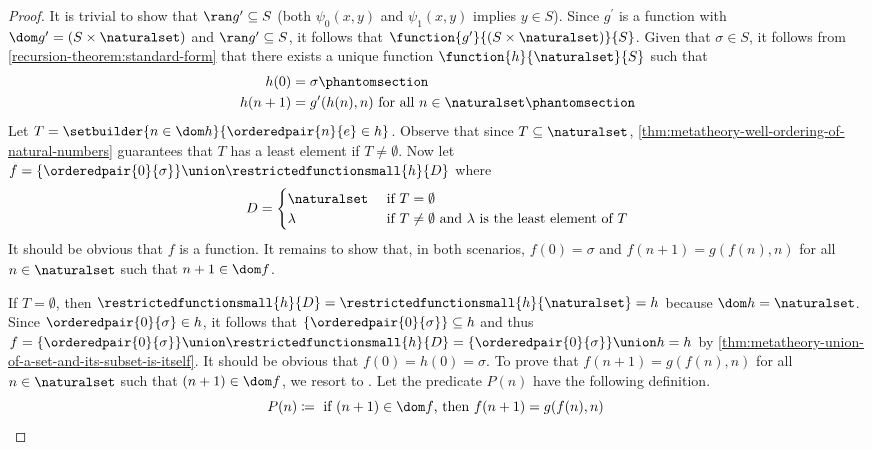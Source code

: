 \begin{proof}
    \vspace{0.3cm}
    \noindent
    It is trivial to show that \( \ran g^{\prime} \subseteq S \) (both \( \psi_{0}(x, y) \) and \( \psi_{1}(x, y) \) implies \( y \in S \)).
    Since \( g^{\prime} \) is a function with \( \dom g^{\prime} = \mleft( S \times \naturalset \mright) \) and \( \ran g^{\prime} \subseteq S \),
    it follows that \( \function{g^{\prime}}{\mleft( S \times \naturalset \mright)}{S} \).
    Given that \( \sigma \in S \), it follows from \cref{recursion-theorem:standard-form} that there exists a unique function
    \( \function{h}{\naturalset}{S} \) such that
    \begin{align}
        h(0) &= \sigma \phantomsection \label{eq:h-is-sigma-at-0} \\
        h(n + 1) &= g^{\prime}(h(n), n) \ \text{for all \( n \in \naturalset \)} \phantomsection \label{eq:recursive-properties-of-h}
    \end{align}
    Let \( T = \setbuilder{n \in \dom h}{\orderedpair{n}{e} \in h} \).
    Observe that since \( T \subseteq \naturalset \), \cref{thm:metatheory-well-ordering-of-natural-numbers} guarantees that \( T \) has a least element
    if \( T \neq \emptyset \).
    Now let \( f = \mleft\{ \orderedpair{0}{\sigma} \mright\} \union \restrictedfunctionsmall{h}{D} \) where
    \begin{equation*}
        D =
        \begin{cases}
            \naturalset \ &\text{if} \ T = \emptyset\\
            \lambda \ &\text{if} \ T \neq \emptyset \ \text{and \( \lambda \) is the least element of \( T \)}
        \end{cases}
    \end{equation*}
    It should be obvious that \( f \) is a function.
    It remains to show that, in both scenarios, \( f(0) = \sigma \) and \( f(n + 1) = g(f(n), n) \) for all \( n \in \naturalset \) such that \( n + 1 \in \dom f \).

    \vspace{0.3cm}
    \noindent
    If \( T = \emptyset \), then \( \restrictedfunctionsmall{h}{D} = \restrictedfunctionsmall{h}{\naturalset} = h \) because \( \dom h = \naturalset \).
    Since \( \orderedpair{0}{\sigma} \in h \), it follows that \( \mleft\{ \orderedpair{0}{\sigma} \mright\} \subseteq h \)
    and thus \( f = \mleft\{ \orderedpair{0}{\sigma} \mright\} \union \restrictedfunctionsmall{h}{D} = \mleft\{ \orderedpair{0}{\sigma} \mright\} \union h = h \)
    by \cref{thm:metatheory-union-of-a-set-and-its-subset-is-itself}.
    It should be obvious that \( f(0) = h(0) = \sigma \).
    To prove that \( f(n + 1) = g(f(n), n) \) for all \( n \in \naturalset \) such that \( \mleft( n + 1 \mright) \in \dom f \), we resort to
    .
    Let the predicate \( P(n) \) have the following definition.
    \begin{equation*}
        P(n) \coloneq \text{ if \( \mleft( n + 1 \mright) \in \dom f \), then \( f(n + 1) = g(f(n), n) \) }
    \end{equation*}
    

\end{proof}
